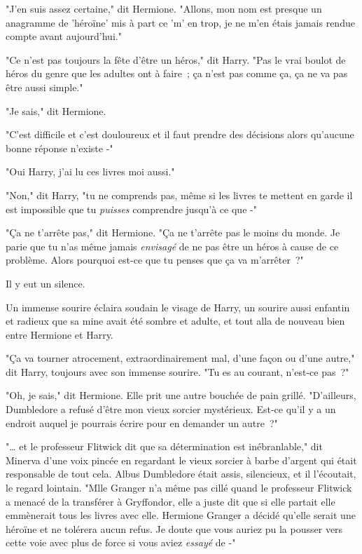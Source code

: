 "J'en suis assez certaine," dit Hermione. "Allons, mon nom est presque un anagramme de 'héroïne' mis à part ce 'm' en trop, je ne m'en étais jamais rendue compte avant aujourd'hui."

"Ce n'est pas toujours la fête d'être un héros," dit Harry. "Pas le vrai boulot de héros du genre que les adultes ont à faire~; ça n'est pas comme ça, ça ne va pas être aussi simple."

"Je sais," dit Hermione.

"C'est difficile et c'est douloureux et il faut prendre des décisions alors qu'aucune bonne réponse n'existe -"

"Oui Harry, j'ai lu ces livres moi aussi."

"Non," dit Harry, "tu ne comprends pas, même si les livres te mettent en garde il est impossible que tu \emph{puisses} comprendre jusqu'à ce que -"

"Ça ne t'arrête pas," dit Hermione. "Ça ne t'arrête pas le moins du monde. Je parie que tu n'as même jamais \emph{envisagé} de ne pas être un héros à cause de ce problème. Alors pourquoi est-ce que tu penses que ça va m'arrêter~?"

Il y eut un silence.

Un immense sourire éclaira soudain le visage de Harry, un sourire aussi enfantin et radieux que sa mine avait été sombre et adulte, et tout alla de nouveau bien entre Hermione et Harry.

"Ça va tourner atrocement, extraordinairement mal, d'une façon ou d'une autre," dit Harry, toujours avec son immense sourire. "Tu es au courant, n'est-ce pas~?"

"Oh, je sais," dit Hermione. Elle prit une autre bouchée de pain grillé. "D'ailleurs, Dumbledore a refusé d'être mon vieux sorcier mystérieux. Est-ce qu'il y a un endroit auquel je pourrais écrire pour en demander un autre~?"


"… et le professeur Flitwick dit que sa détermination est inébranlable," dit Minerva d'une voix pincée en regardant le vieux sorcier à barbe d'argent qui était responsable de tout cela. Albus Dumbledore était assis, silencieux, et il l'écoutait, le regard lointain. "Mlle Granger n'a même pas cillé quand le professeur Flitwick a menacé de la transférer à Gryffondor, elle a juste dit que si elle partait elle emmènerait tous les livres avec elle. Hermione Granger a décidé qu'elle serait une héroïne et ne tolérera aucun refus. Je doute que vous auriez pu la pousser vers cette voie avec plus de force si vous aviez \emph{essayé} de -"


